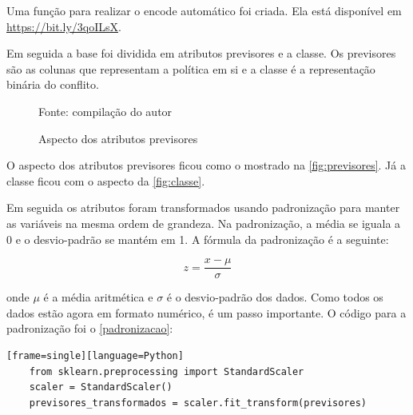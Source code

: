 Uma função para realizar o encode automático foi criada. Ela está disponível em \hyperlink{https://bit.ly/3qoILsX}{https://bit.ly/3qoILsX}.

Em seguida a base foi dividida em atributos previsores e a classe. Os previsores são as colunas que representam a política em si e a classe é a representação binária do conflito.

\begin{figure}[H]
	\centering
	\caption{Aspecto dos atributos previsores}
	
	\label{fig:previsores}
	{\scriptsize Fonte: compilação do autor}
\end{figure}

O aspecto dos atributos previsores ficou como o mostrado na \autoref{fig:previsores}. Já a classe ficou com o aspecto da \autoref{fig:classe}.

Em seguida os atributos foram transformados usando padronização para manter as variáveis na mesma ordem de grandeza. Na padronização, a média se iguala a 0 e o desvio-padrão se mantém em 1. A fórmula da padronização é a seguinte:

\begin{equation}\label{eq:padronizacao}
z = \frac{x - \mu}{\sigma}
\end{equation}

onde $\mu$ é a média aritmética e $\sigma$ é o desvio-padrão dos dados. Como todos os dados estão agora em formato numérico, é um passo importante. O código para a padronização foi o \autoref{padronizacao}:


\begin{lstlisting}[caption={Código da Padronização},label=padronizacao][frame=single][language=Python]
	from sklearn.preprocessing import StandardScaler
	scaler = StandardScaler()
	previsores_transformados = scaler.fit_transform(previsores)
\end{lstlisting}

